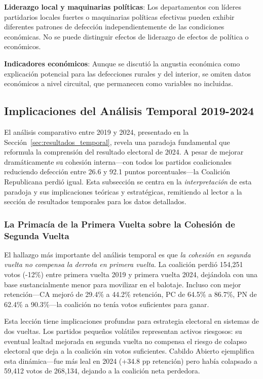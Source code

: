 \textbf{Liderazgo local y maquinarias políticas}: Los departamentos con líderes partidarios locales fuertes o maquinarias políticas efectivas pueden exhibir diferentes patrones de defección independientemente de las condiciones económicas. No se puede distinguir efectos de liderazgo de efectos de política o económicos.

\textbf{Indicadores económicos}: Aunque se discutió la angustia económica como explicación potencial para las defecciones rurales y del interior, se omiten datos económicos a nivel circuital, que permanecen como variables no incluidas.

\subsection{Implicaciones del Análisis Temporal 2019-2024}
\label{sec:discusion_temporal}

El análisis comparativo entre 2019 y 2024, presentado en la Sección~\ref{sec:resultados_temporal}, revela una paradoja fundamental que reformula la comprensión del resultado electoral de 2024. A pesar de mejorar dramáticamente su cohesión interna---con todos los partidos coalicionales reduciendo defección entre 26.6 y 92.1 puntos porcentuales---la Coalición Republicana perdió igual. Esta subsección se centra en la \textit{interpretación} de esta paradoja y sus implicaciones teóricas y estratégicas, remitiendo al lector a la sección de resultados temporales para los datos detallados.

\subsubsection{La Primacía de la Primera Vuelta sobre la Cohesión de Segunda Vuelta}

El hallazgo más importante del análisis temporal es que \textit{la cohesión en segunda vuelta no compensa la derrota en primera vuelta}. La coalición perdió 154,251 votos (-12\%) entre primera vuelta 2019 y primera vuelta 2024, dejándola con una base sustancialmente menor para movilizar en el balotaje. Incluso con mejor retención---CA mejoró de 29.4\% a 44.2\% retención, PC de 64.5\% a 86.7\%, PN de 62.4\% a 90.3\%---la coalición no tenía votos suficientes para ganar.

Esta lección tiene implicaciones profundas para estrategia electoral en sistemas de dos vueltas. Los partidos pequeños volátiles representan activos riesgosos: su eventual lealtad mejorada en segunda vuelta no compensa el riesgo de colapso electoral que deja a la coalición sin votos suficientes. Cabildo Abierto ejemplifica esta dinámica---fue más leal en 2024 (+34.8 pp retención) pero había colapsado a 59,412 votos de 268,134, dejando a la coalición neta perdedora.

